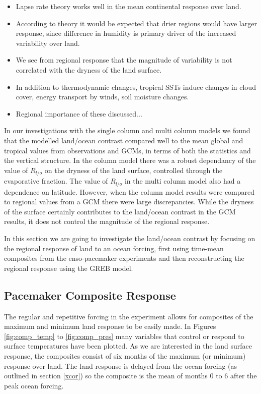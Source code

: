 \begin{itemize}
	\item Lapse rate theory works well in the mean continental response over 
		land.
	\item According to theory it would be expected that drier regions would have 
		larger response, since difference in humidity is primary driver of the 
		increased variability over land.
	\item We see from regional response that the magnitude of variability is not 
		correlated with the dryness of the land surface.
	\item In addition to thermodynamic changes, tropical SSTs induce changes in 
		cloud cover, energy transport by winds, soil moisture changes.
	\item Regional importance of these discussed...
\end{itemize}

In our investigations with the single column and multi column models we found 
that the modelled land/ocean contrast compared well to the mean global and 
tropical values from observations and GCMs, in terms of both the statistics and 
the vertical structure. In the column model there was a robust dependancy of the 
value of $R_{l/o}$ on the dryness of the land surface, controlled through the 
evaporative fraction. The value of $R_{l/o}$ in the multi column model also had 
a dependence on latitude. However, when the column model results were compared 
to regional values from a GCM there were large discrepancies. While the dryness 
of the surface certainly contributes to the land/ocean contrast in the GCM 
results, it does not control the magnitude of the regional response.  

In this section we are going to investigate the land/ocean contrast by focusing 
on the regional response of land to an ocean forcing, first using time-mean 
composites from the enso-pacemaker experiments and then reconstructing the 
regional response using the GREB model. 
\newpage

\subsection{Pacemaker Composite Response}

The regular and repetitive forcing in the experiment allows for composites of 
the maximum and minimum land response to be easily made. In Figures 
\ref{fig:comp_temp} to \ref{fig:comp_pres} many variables that control or 
respond to surface temperatures have been plotted. As we are interested in the 
land surface response, the composites consist of six months of the maximum (or 
minimum) response over land. The land response is delayed from the ocean forcing 
(as outlined in section \ref{xcor}) so the composite is the mean of months 0 to 
6 after the peak ocean forcing.

